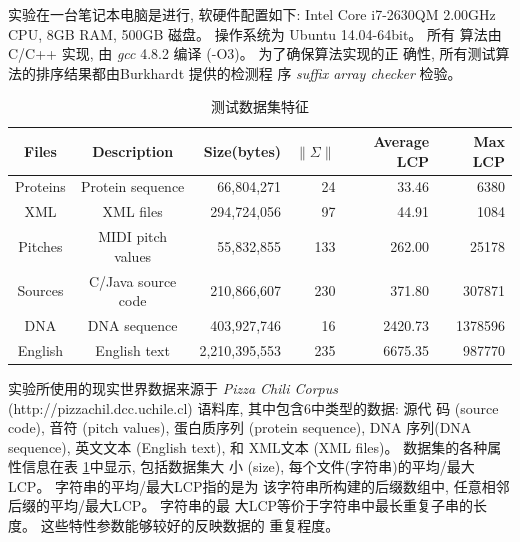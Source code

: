 实验在一台笔记本电脑是进行, 软硬件配置如下: Intel Core i7-2630QM
2.00GHz CPU, 8GB RAM, 500GB 磁盘。 操作系统为 Ubuntu 14.04-64bit。  所有
算法由 C/C++ 实现, 由 \emph{gcc} 4.8.2 编译 (-O3)。 为了确保算法实现的正
确性, 所有测试算法的排序结果都由Burkhardt \cite{Burkhardt2003} 提供的检测程
序 \emph{suffix array checker} 检验。

\begin{table}[!htbp]
\caption{测试数据集特征}
\begin{tabular}{|c|c|r|r|r|r|} \hline Files & Description &
  Size(bytes) & $\|\Sigma\|$ & Average LCP & Max LCP \\ \hline
  Proteins & Protein sequence & 66,804,271 & 24 & 33.46 & 6380\\
  XML & XML files & 294,724,056 & 97 & 44.91 & 1084 \\
  Pitches & MIDI pitch values & 55,832,855 & 133 & 262.00 & 25178\\
  Sources & C/Java source code & 210,866,607 & 230 & 371.80 & 307871\\
  DNA & DNA sequence & 403,927,746 & 16 & 2420.73 & 1378596\\
  English & English text & 2,210,395,553 & 235 &6675.35 & 987770\\
  \hline
  \end{tabular}
  \label{tab:data}
\end{table}

实验所使用的现实世界数据来源于 \emph{Pizza Chili Corpus}
(http://pizzachil.dcc.uchile.cl) 语料库, 其中包含6中类型的数据: 源代
码 (source code), 音符 (pitch values), 蛋白质序列 (protein sequence),
DNA 序列(DNA sequence), 英文文本 (English text), 和 XML文本 (XML
files)。 数据集的各种属性信息在表 \ref{tab:data}中显示, 包括数据集大
小 (size), 每个文件(字符串)的平均/最大LCP。 字符串的平均/最大LCP指的是为
该字符串所构建的后缀数组中, 任意相邻后缀的平均/最大LCP。 字符串的最
大LCP等价于字符串中最长重复子串的长度。 这些特性参数能够较好的反映数据的
重复程度。

